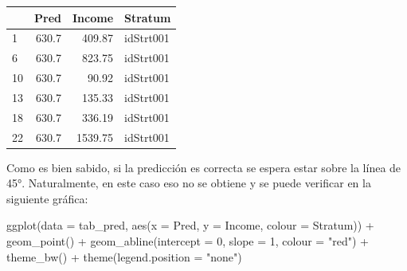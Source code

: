 \documentclass[
  12pt,
]{book}
\newenvironment{Shaded}{\begin{snugshade}}{\end{snugshade}}
\newcommand{\AttributeTok}[1]{\textcolor[rgb]{0.77,0.63,0.00}{#1}}
\newcommand{\CommentTok}[1]{\textcolor[rgb]{0.56,0.35,0.01}{\textit{#1}}}
\newcommand{\DecValTok}[1]{\textcolor[rgb]{0.00,0.00,0.81}{#1}}
\newcommand{\FunctionTok}[1]{\textcolor[rgb]{0.00,0.00,0.00}{#1}}
\newcommand{\NormalTok}[1]{#1}
\newcommand{\OtherTok}[1]{\textcolor[rgb]{0.56,0.35,0.01}{#1}}
\newcommand{\SpecialCharTok}[1]{\textcolor[rgb]{0.00,0.00,0.00}{#1}}
\newcommand{\StringTok}[1]{\textcolor[rgb]{0.31,0.60,0.02}{#1}}
\begin{document}
\begin{Shaded}
\end{Shaded}

\begin{tabular}{l|r|r|l}
\hline
  & Pred & Income & Stratum\\
\hline
1 & 630.7 & 409.87 & idStrt001\\
\hline
6 & 630.7 & 823.75 & idStrt001\\
\hline
10 & 630.7 & 90.92 & idStrt001\\
\hline
13 & 630.7 & 135.33 & idStrt001\\
\hline
18 & 630.7 & 336.19 & idStrt001\\
\hline
22 & 630.7 & 1539.75 & idStrt001\\
\hline
\end{tabular}

Como es bien sabido, si la predicción es correcta se espera estar sobre la línea de 45°. Naturalmente, en este caso eso no se obtiene y se puede verificar en la siguiente gráfica:

\begin{Shaded}
\begin{Highlighting}[]
\FunctionTok{ggplot}\NormalTok{(}\AttributeTok{data =}\NormalTok{ tab\_pred, }\FunctionTok{aes}\NormalTok{(}\AttributeTok{x =}\NormalTok{ Pred, }\AttributeTok{y =}\NormalTok{ Income, }\AttributeTok{colour =}\NormalTok{ Stratum)) }\SpecialCharTok{+} 
  \FunctionTok{geom\_point}\NormalTok{() }\SpecialCharTok{+} \FunctionTok{geom\_abline}\NormalTok{(}\AttributeTok{intercept =} \DecValTok{0}\NormalTok{, }\AttributeTok{slope =} \DecValTok{1}\NormalTok{, }\AttributeTok{colour =} \StringTok{"red"}\NormalTok{) }\SpecialCharTok{+}
  \FunctionTok{theme\_bw}\NormalTok{() }\SpecialCharTok{+} \FunctionTok{theme}\NormalTok{(}\AttributeTok{legend.position =} \StringTok{"none"}\NormalTok{) }
\end{Highlighting}
\end{Shaded}
\end{document}
